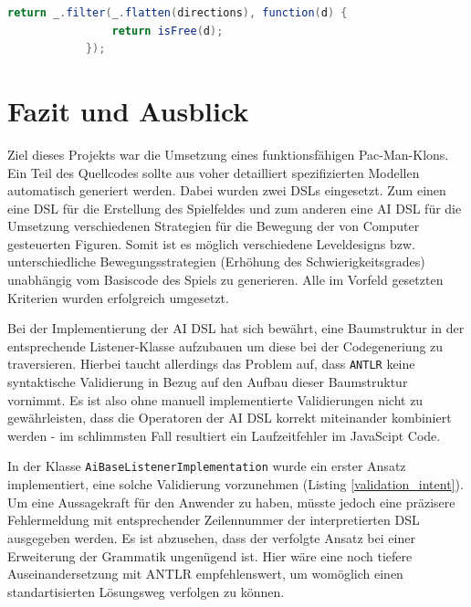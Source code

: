 \documentclass[conference]{IEEEtran}
\begin{document}
\begin{lstlisting}[language=Java, captionpos=b, caption=Implementierung der Filter-Free Methode mit Hilfe von funktionalen Hilfsmitteln von underscore.js, label=underscore_speaking]
return _.filter(_.flatten(directions), function(d) {
                return isFree(d);
            });
\end{lstlisting}


\section{Fazit und Ausblick}
Ziel dieses Projekts war die Umsetzung eines funktionsfähigen Pac-Man-Klons. Ein Teil des Quellcodes sollte aus voher detailliert spezifizierten Modellen automatisch generiert werden.  Dabei wurden zwei DSLs eingesetzt. Zum einen eine DSL für die Erstellung des Spielfeldes und zum anderen eine AI DSL für die Umsetzung verschiedenen Strategien für die Bewegung der von Computer gesteuerten Figuren. Somit ist es möglich verschiedene Leveldesigns bzw. unterschiedliche Bewegungsstrategien (Erhöhung des Schwierigkeitsgrades) unabhängig vom Basiscode des Spiels zu generieren. Alle im Vorfeld gesetzten Kriterien wurden erfolgreich umgesetzt.

Bei der Implementierung der AI DSL hat sich bewährt, eine Baumstruktur in der entsprechende Listener-Klasse aufzubauen um diese bei der Codegeneriung zu traversieren. Hierbei taucht allerdings das Problem auf, dass \texttt{ANTLR} keine syntaktische Validierung in Bezug auf den Aufbau dieser Baumstruktur vornimmt. Es ist also ohne manuell implementierte Validierungen nicht zu gewährleisten, dass die Operatoren der AI DSL korrekt miteinander kombiniert werden - im schlimmsten Fall resultiert ein Laufzeitfehler im JavaScipt Code.

In der Klasse \texttt{AiBaseListenerImplementation} wurde ein erster Ansatz implementiert, eine solche Validierung vorzunehmen (Listing \ref{validation_intent}). Um eine Aussagekraft für den Anwender zu haben, müsste jedoch eine präzisere Fehlermeldung mit entsprechender Zeilennummer der interpretierten DSL ausgegeben werden. Es ist abzusehen, dass der verfolgte Ansatz bei einer Erweiterung der Grammatik ungenügend ist. Hier wäre eine noch tiefere Auseinandersetzung mit ANTLR empfehlenswert, um womöglich einen standartisierten Lösungsweg verfolgen zu können.
\end{document}
